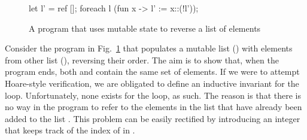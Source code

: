 \begin{figure}[!h]
\begin{ocaml}
let l' = ref [];
foreach l (fun x -> l' := x::(!l'));
\end{ocaml}
\caption{A program that uses mutable state to reverse a list of elements}
\label{fig:mutable-rev}
\end{figure}

Consider the program in Fig.~\ref{fig:mutable-rev} that populates a
mutable list () with elements from other list (), reversing
their order. The aim is to show that, when the program ends, both
 and  contain the same set of elements. If we were to
attempt Hoare-style verification, we are obligated to define an
inductive invariant for the  loop. Unfortunately, none
exists for the loop, as such. The reason is that there is no way in
the program to refer to the elements in the list that have already
been added to the list . This problem can be easily rectified by
introducing an integer  that keeps track of the index of  in
. 


